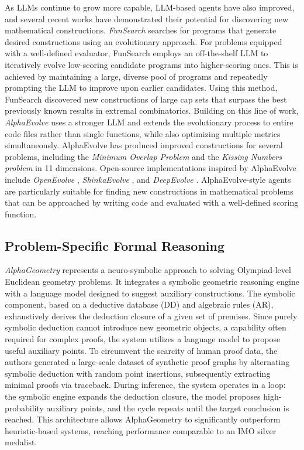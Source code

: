 \documentclass[11pt]{article}
\numberwithin{equation}{section}
\begin{document}
As LLMs continue to grow more capable, LLM-based agents have also improved, and several recent works have demonstrated their potential for discovering new mathematical constructions. \textit{FunSearch} \cite{romera2024mathematical} searches for programs that generate desired constructions using an evolutionary approach. For problems equipped with a well-defined evaluator, FunSearch employs an off-the-shelf LLM to iteratively evolve low-scoring candidate programs into higher-scoring ones. This is achieved by maintaining a large, diverse pool of programs and repeatedly prompting the LLM to improve upon earlier candidates. Using this method, FunSearch discovered new constructions of large cap sets that surpass the best previously known results in extremal combinatorics. Building on this line of work, \textit{AlphaEvolve} \cite{novikov2025alphaevolve} uses a stronger LLM and extends the evolutionary process to entire code files rather than single functions, while also optimizing multiple metrics simultaneously. AlphaEvolve has produced improved constructions for several problems, including the \textit{Minimum Overlap Problem} and the \textit{Kissing Numbers problem} in 11 dimensions. Open-source implementations inspired by AlphaEvolve include \textit{OpenEvolve} \cite{openevolve}, \textit{ShinkaEvolve} \cite{lange2025shinkaevolve}, and \textit{DeepEvolve} \cite{liu2025scientific}. AlphaEvolve-style agents are particularly suitable for finding new constructions in mathematical problems that can be approached by writing code and evaluated with a well-defined scoring function.



\subsection{Problem-Specific Formal Reasoning}

\textit{AlphaGeometry} \cite{trinh2024solving} represents a neuro-symbolic approach to solving Olympiad-level Euclidean geometry problems. It integrates a symbolic geometric reasoning engine with a language model designed to suggest auxiliary constructions. The symbolic component, based on a deductive database (DD) \cite{chou2000deductive} and algebraic rules (AR), exhaustively derives the deduction closure of a given set of premises. Since purely symbolic deduction cannot introduce new geometric objects, a capability often required for complex proofs, the system utilizes a language model to propose useful auxiliary points. To circumvent the scarcity of human proof data, the authors generated a large-scale dataset of synthetic proof graphs by alternating symbolic deduction with random point insertions, subsequently extracting minimal proofs via traceback. During inference, the system operates in a loop: the symbolic engine expands the deduction closure, the model proposes high-probability auxiliary points, and the cycle repeats until the target conclusion is reached. This architecture allows AlphaGeometry to significantly outperform heuristic-based systems, reaching performance comparable to an IMO silver medalist.
\end{document}
